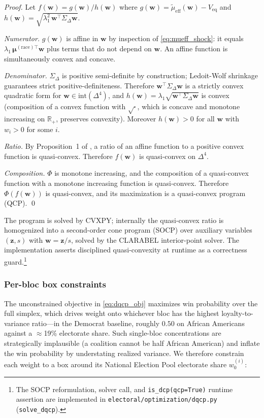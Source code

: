 \documentclass[12pt, letterpaper]{article}
\theoremstyle{definition}
\newcommand{\Veq}{V_{\mathrm{eq}}}
\newcommand{\SigmaDelta}{\Sigma_{\Delta}}
\newcommand{\lambdaone}{\lambda_1}
\newcommand{\boldw}{\mathbf{w}}
\newcommand{\boldmu}{\boldsymbol{\mu}}
\begin{document}
\begin{proof}
Let $f(\boldw) = g(\boldw) / h(\boldw)$ where
$g(\boldw) = \tilde{\mu}_{\mathrm{eff}}(\boldw) - \Veq$ and
$h(\boldw) = \sqrt{\lambdaone^2\, \boldw^\top \SigmaDelta \boldw}$.

\textit{Numerator.} $g(\boldw)$ is affine in $\boldw$ by inspection of
\eqref{eq:mueff_shock}: it equals $\lambdaone\, \boldmu^{(\text{race})\top}\boldw$
plus terms that do not depend on $\boldw$. An affine function is simultaneously
convex and concave.

\textit{Denominator.} $\SigmaDelta$ is positive semi-definite by construction;
Ledoit-Wolf shrinkage guarantees strict positive-definiteness. Therefore
$\boldw^\top \SigmaDelta \boldw$ is a strictly convex quadratic form for
$\boldw \in \text{int}(\Delta^4)$, and $h(\boldw) = \lambdaone
\sqrt{\boldw^\top \SigmaDelta \boldw}$ is convex (composition of a convex
function with $\sqrt{\cdot}$, which is concave and monotone increasing on
$\mathbb{R}_+$, preserves convexity). Moreover $h(\boldw) > 0$ for all
$\boldw$ with $w_i > 0$ for some $i$.

\textit{Ratio.} By Proposition~1 of \citet{DiamondBoyd2019}, a ratio of an
affine function to a positive convex function is quasi-convex. Therefore
$f(\boldw)$ is quasi-convex on $\Delta^4$.

\textit{Composition.} $\Phi$ is monotone increasing, and the composition of a
quasi-convex function with a monotone increasing function is quasi-convex.
Therefore $\Phi(f(\boldw))$ is quasi-convex, and its maximization is a
quasi-convex program (QCP). \qed
\end{proof}

The program is solved by CVXPY; internally the quasi-convex ratio is homogenized
into a second-order cone program (SOCP) over auxiliary variables $(\mathbf{z}, s)$
with $\boldw = \mathbf{z}/s$, solved by the CLARABEL interior-point solver. The
implementation asserts disciplined quasi-convexity at runtime as a correctness
guard.\footnote{The SOCP reformulation, solver call, and \texttt{is\_dcp(qcp=True)}
runtime assertion are implemented in \texttt{electoral/optimization/dqcp.py}
(\texttt{solve\_dqcp}).}

\subsubsection{Per-bloc box constraints}
\label{sec:bounds}

The unconstrained objective in \eqref{eq:dqcp_obj} maximizes win probability over the
full simplex, which drives weight onto whichever bloc has the highest loyalty-to-variance
ratio---in the Democrat baseline, roughly $0.50$ on African Americans against a
$\approx$19\% electorate share. Such single-bloc concentrations are strategically
implausible (a coalition cannot be half African American) and inflate the win
probability by understating realized variance. We therefore constrain each weight to a
box around its National Election Pool electorate share $w_0^{(i)}$:
\end{document}
